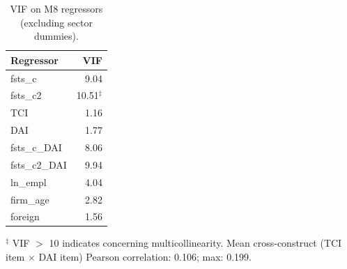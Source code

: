 \begin{table}[ht]
\centering
\caption{VIF on M8 regressors (excluding sector dummies).}
\label{tab:vif}
\begin{tabular}{lr}
\toprule
Regressor & VIF \\
\midrule
fsts_c & 9.04 \\
fsts_c2 & 10.51$^{\ddagger}$ \\
TCI & 1.16 \\
DAI & 1.77 \\
fsts_c_DAI & 8.06 \\
fsts_c2_DAI & 9.94 \\
ln_empl & 4.04 \\
firm_age & 2.82 \\
foreign & 1.56 \\
\bottomrule
\end{tabular}
\par\smallskip
\footnotesize $^{\ddagger}$ VIF $>$ 10 indicates concerning multicollinearity. Mean cross-construct (TCI item $\times$ DAI item) Pearson correlation: 0.106; max: 0.199.
\end{table}